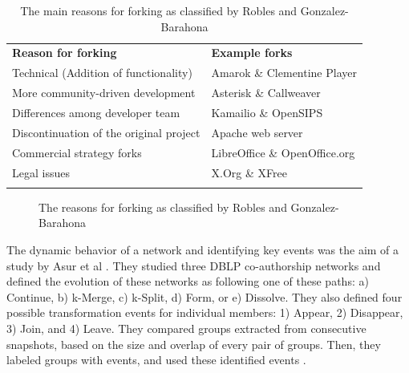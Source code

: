 \documentclass{acm_proc_article-sp}
\begin{document}
\begin{table}[!htbp]
\centering
\caption{The main reasons for forking as classified by Robles and Gonzalez-Barahona \cite{Robles}}
\label{tableReasonsForForking}
\begin{tabular}{p{} p{}}
\hline\noalign{\smallskip}
\textbf{Reason for forking} & \textbf{Example forks} \\
\noalign{\smallskip}\hline\noalign{\smallskip}
Technical (Addition of functionality) & Amarok \& Clementine Player \\ \hline
More community-driven development & Asterisk \& Callweaver \\ \hline
Differences among developer team & Kamailio \& OpenSIPS \\ \hline
Discontinuation of the original project & Apache web server \\ \hline
Commercial strategy forks & LibreOffice \& OpenOffice.org \\ \hline
Legal issues & X.Org \& XFree \\
\noalign{\smallskip}\hline
\end{tabular}
\end{table}

\begin{figure} [!htbp]
\centering
\caption{The reasons for forking as classified by Robles and Gonzalez-Barahona \cite{Robles}}
\label{figureReasonsForForkingPieChart}
\end{figure}

The dynamic behavior of a network and identifying key events was the aim of a study by Asur et al \cite{Asur}. They studied three DBLP co-authorship networks and defined the evolution of these networks as following one of these paths: a) Continue, b) k-Merge, c) k-Split, d) Form, or e) Dissolve. They also defined four possible transformation events for individual members: 1) Appear, 2) Disappear, 3) Join, and 4) Leave. They compared groups extracted from consecutive snapshots, based on the size and overlap of every pair of groups. Then, they labeled groups with events, and used these identified events \cite{Asur}.
\end{document}
